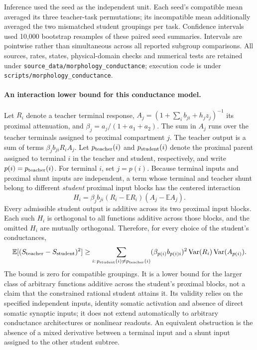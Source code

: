 Inference used the seed as the independent unit. Each seed's compatible mean averaged its three teacher-task permutations; its incompatible mean additionally averaged the two mismatched student groupings per task. Confidence intervals used 10,000 bootstrap resamples of these paired seed summaries. Intervals are pointwise rather than simultaneous across all reported subgroup comparisons. All sources, rates, states, physical-domain checks and numerical tests are retained under \texttt{source\_data/morphology\_conductance}; execution code is under \texttt{scripts/morphology\_conductance}.

\paragraph{An interaction lower bound for this conductance model.}
Let $R_i$ denote a teacher terminal response, $A_j=(1+\sum_i b_{ji}+h_jz_j)^{-1}$ its proximal attenuation, and $\beta_j=a_j/(1+a_1+a_2)$. The sum in $A_j$ runs over the teacher terminals assigned to proximal compartment $j$. The teacher output is a sum of terms $\beta_j b_{ji}R_iA_j$. Let $p_{\rm teacher}(i)$ and $p_{\rm student}(i)$ denote the proximal parent assigned to terminal $i$ in the teacher and student, respectively, and write $p(i)=p_{\rm teacher}(i)$. For terminal $i$, set $j=p(i)$. Because terminal inputs and proximal shunt inputs are independent, a term whose terminal and teacher shunt belong to different \emph{student} proximal input blocks has the centered interaction
\begin{equation}
H_i=\beta_jb_{ji}(R_i-\mathbb E R_i)(A_j-\mathbb E A_j).
\end{equation}
Every admissible student output is additive across its two proximal input blocks. Each such $H_i$ is orthogonal to all functions additive across those blocks, and the omitted $H_i$ are mutually orthogonal. Therefore, for every choice of the student's conductances,
\begin{equation}
\mathbb E[(S_{\rm teacher}-S_{\rm student})^2]
\geq\sum_{i:\,p_{\rm student}(i)\ne p_{\rm teacher}(i)}
 (\beta_{p(i)}b_{p(i)i})^2
 \operatorname{Var}(R_i)\operatorname{Var}(A_{p(i)}).
\end{equation}
The bound is zero for compatible groupings. It is a lower bound for the larger class of arbitrary functions additive across the student's proximal blocks, not a claim that the constrained rational student attains it. Its validity relies on the specified independent inputs, identity somatic activation and absence of direct somatic synaptic inputs; it does not extend automatically to arbitrary conductance architectures or nonlinear readouts. An equivalent obstruction is the absence of a mixed derivative between a terminal input and a shunt input assigned to the other student subtree.

